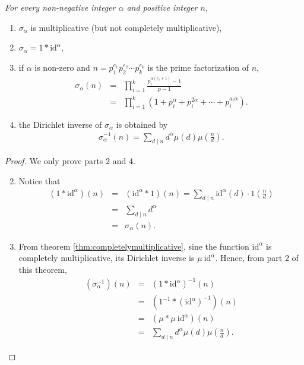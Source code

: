 \documentclass[12pt]{subfile}
\begin{document}
	\begin{theorem}\slshape
		For every non-negative integer $\alpha$ and positive integer $n$,
			\begin{enumerate}
				\item $\sigma_\alpha$ is multiplicative (but not completely multiplicative),
				\item $\sigma_\alpha = 1 \ast \text{id}^\alpha$,
				\item if $\alpha$ is non-zero and $n=p_1^{e_1}p_2^{e_2}\cdots p_k^{e_k}$ is the prime factorization of $n$,
					\begin{eqnarray*}
						\sigma_\alpha(n) &=& \prod_{i=1}^{k} \frac{p_i^{\alpha(e_i+1)}-1}{p-1}\\
									 &=& \prod_{i=1}^k \left(1 + p_i^\alpha + p_i^{2\alpha} + \cdots + p_i^{a_i \alpha}\right).
					\end{eqnarray*}
				\item the Dirichlet inverse of $\sigma_\alpha$ is obtained by
					\begin{align*}
						\sigma_\alpha^{-1} (n) = \sum_{d\mid n} d^\alpha\mu(d) \mu\left(\frac{n}{d}\right).
					\end{align*}
			\end{enumerate}
	\end{theorem}

	\begin{proof}
		We only prove parts $2$ and $4$.
			\begin{enumerate} \setcounter{enumi}{1}
				\item Notice that
					\begin{eqnarray*}
						(1 \ast \text{id}^\alpha)(n)
							&=& ( \text{id}^\alpha\ast 1)(n) = \sum_{d\mid n} \text{id}^\alpha (d) \cdot 1\left(\frac{n}{d}\right)\\
							&=& \sum_{d\mid n} d^\alpha \\
							&=& \sigma_\alpha (n).
					\end{eqnarray*}
				\setcounter{enumi}{3}
				\item From theorem \ref{thm:completelymultiplicative}, sine the function $\text{id}^\alpha$ is completely multiplicative, its Dirichlet inverse is $\mu \ \text{id}^\alpha$. Hence, from part $2$ of this theorem,
					\begin{eqnarray*}
						(\sigma_\alpha^{-1})(n)
									&=& \left(1 \ast \text{id}^\alpha\right)^{-1}(n)\\
									&=& \left(1^{-1} \ast  \left(\text{id}^\alpha\right)^{-1}\right)(n)\\
								    &=& \left(\mu \ast \mu \ \text{id}^\alpha\right)(n)\\
								    &=& \sum_{d\mid n} d^\alpha \mu(d) \mu\left(\frac{n}{d}\right).
					\end{eqnarray*}
			\end{enumerate}
	\end{proof}
\end{document}
